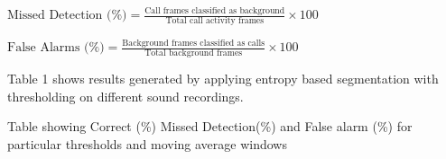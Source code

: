 \documentclass[a4paper]{article}
\begin{document}
$\text{Missed Detection (\%)}=\frac{\text{Call  frames classified as background}} {\text{Total call activity frames}} \times 100$\newline

$\text{False Alarms (\%)}=\frac{\text{Background  frames classified as calls}} {\text{Total background frames}} \times 100$ \newline



Table 1 shows results generated by applying entropy based segmentation with thresholding on different sound recordings. 

  



\begin{table}[]
	\centering
	\caption{Table showing Correct (\%) Missed Detection(\%) and False alarm (\%) for particular thresholds and moving average windows } 
	\label{Table 1}


\end{table}
\end{document}
